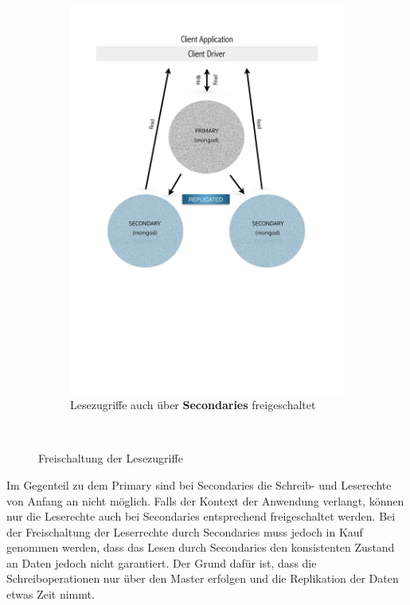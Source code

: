 \begin{figure}[H]
\begin{subfigure}[t]{0.49\textwidth}
	\includegraphics[trim = 0mm 90mm 0mm 20mm, clip, width=1.0\textwidth]{resources/replicaSet/eventualConsistency}
	\caption[Lesezugriffe auch über Secondaries freigeschaltet]{Lesezugriffe auch über \textbf{Secondaries} freigeschaltet}
	\label{img:slaveOk}
   \end{subfigure}\\[5pt]%
   \caption{Freischaltung der Lesezugriffe}
   \label{img:secondariesLowToRead}
\end{figure}
Im Gegenteil zu dem Primary sind bei Secondaries die Schreib- und Leserechte von Anfang an nicht möglich. Falls der Kontext der Anwendung verlangt, können nur die Leserechte auch bei Secondaries entsprechend freigeschaltet werden. Bei der Freischaltung der Leserrechte durch Secondaries muss jedoch in Kauf genommen werden, dass das Lesen durch Secondaries den konsistenten Zustand an Daten jedoch nicht garantiert. Der Grund dafür ist, dass die Schreiboperationen nur über den Master erfolgen und die Replikation der Daten etwas Zeit nimmt.

